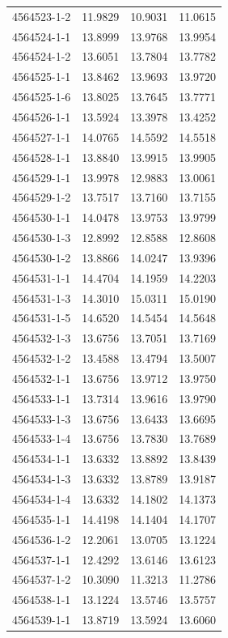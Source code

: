 \begin{longtable}{lrrr}
4564523-1-2 & 11.9829 & 10.9031 & 11.0615 \\
4564524-1-1 & 13.8999 & 13.9768 & 13.9954 \\
4564524-1-2 & 13.6051 & 13.7804 & 13.7782 \\
4564525-1-1 & 13.8462 & 13.9693 & 13.9720 \\
4564525-1-6 & 13.8025 & 13.7645 & 13.7771 \\
4564526-1-1 & 13.5924 & 13.3978 & 13.4252 \\
4564527-1-1 & 14.0765 & 14.5592 & 14.5518 \\
4564528-1-1 & 13.8840 & 13.9915 & 13.9905 \\
4564529-1-1 & 13.9978 & 12.9883 & 13.0061 \\
4564529-1-2 & 13.7517 & 13.7160 & 13.7155 \\
4564530-1-1 & 14.0478 & 13.9753 & 13.9799 \\
4564530-1-3 & 12.8992 & 12.8588 & 12.8608 \\
4564530-1-2 & 13.8866 & 14.0247 & 13.9396 \\
4564531-1-1 & 14.4704 & 14.1959 & 14.2203 \\
4564531-1-3 & 14.3010 & 15.0311 & 15.0190 \\
4564531-1-5 & 14.6520 & 14.5454 & 14.5648 \\
4564532-1-3 & 13.6756 & 13.7051 & 13.7169 \\
4564532-1-2 & 13.4588 & 13.4794 & 13.5007 \\
4564532-1-1 & 13.6756 & 13.9712 & 13.9750 \\
4564533-1-1 & 13.7314 & 13.9616 & 13.9790 \\
4564533-1-3 & 13.6756 & 13.6433 & 13.6695 \\
4564533-1-4 & 13.6756 & 13.7830 & 13.7689 \\
4564534-1-1 & 13.6332 & 13.8892 & 13.8439 \\
4564534-1-3 & 13.6332 & 13.8789 & 13.9187 \\
4564534-1-4 & 13.6332 & 14.1802 & 14.1373 \\
4564535-1-1 & 14.4198 & 14.1404 & 14.1707 \\
4564536-1-2 & 12.2061 & 13.0705 & 13.1224 \\
4564537-1-1 & 12.4292 & 13.6146 & 13.6123 \\
4564537-1-2 & 10.3090 & 11.3213 & 11.2786 \\
4564538-1-1 & 13.1224 & 13.5746 & 13.5757 \\
4564539-1-1 & 13.8719 & 13.5924 & 13.6060 \\

\end{longtable}
